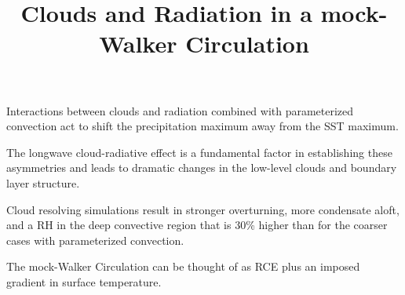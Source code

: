\documentclass[draft]{agujournal2019}
\begin{document}
\title{Clouds and Radiation in a mock-Walker Circulation}


\begin{keypoints}
  \item{Interactions between clouds and radiation combined with parameterized convection act to shift the precipitation 
  maximum away from the SST maximum.}
  \item{The longwave cloud-radiative effect is a fundamental factor in establishing these asymmetries and leads to dramatic
  changes in the low-level clouds and boundary layer structure.}
  \item{Cloud resolving simulations result in stronger overturning, more condensate aloft, and a RH in the deep convective 
  region that is 30\% higher than for the coarser cases with parameterized convection.}
  \item{The mock-Walker Circulation can be thought of as RCE plus an imposed gradient in surface temperature.}
\end{keypoints}
\end{document}
